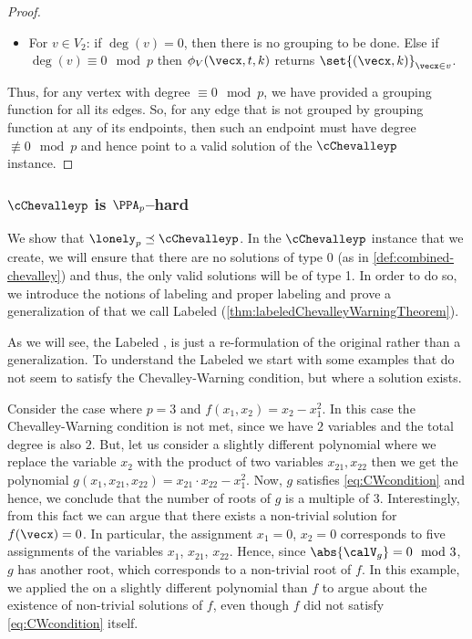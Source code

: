 \begin{proof}
\begin{itemize}[label=$\triangleright$,leftmargin=0.5cm]
\begin{itemize}[leftmargin=0.25cm]
		we define the multiset $\set{(\vecx_j, t(\vecx_j))}_{j \in \bbF_p}$.
		Since $\sum\limits_{j = 0}^{p-1} t(\vecx_j) = 0$, this multiset has
		size multiple of $p$, so we can canonically partition it into groups of size $p$. Then,
		$\phi_V(\vecx, t, k)$ returns the group containing $(\vecx,k)$,
		\item For $v \in V_2$: if $\deg(v) = 0$, then there is no grouping to be done. Else if $\deg(v) \equiv 0 \mod{p}$ then $\phi_V(\vecx,t,k)$ returns
          		$\set{(\vecx,k)}_{\vecx \in v}$.
	  \end{itemize}
\end{itemize}
	Thus, for any vertex with degree $\equiv 0 \mod{p}$, we have provided a grouping function for all its edges. So, for any edge that is not grouped by grouping function at any of its endpoints, then such an endpoint must have degree $\not\equiv 0 \mod{p}$ and hence point to a valid solution of the $\cChevalleyp$ instance.
\end{proof}



\subsubsection{$\cChevalleyp$ is $\PPA_p$--hard}

We show that $\lonely_p \preceq \cChevalleyp$. In the $\cChevalleyp$ instance that we create, we will ensure that there are no solutions of type 0 (as in \autoref{def:combined-chevalley}) and thus, the only valid solutions will be of type 1. In order to do so, we introduce the notions of labeling and proper labeling and prove a generalization of \CWT that we call Labeled \CWT (\autoref{thm:labeledChevalleyWarningTheorem}).

As we will see, the Labeled \CWT, is just a
re-formulation of the original \CWT rather than a generalization. To
understand the Labeled \CWT we start with some
examples that do not seem to satisfy the Chevalley-Warning
condition, but where a solution exists.

\bigskip
{} Consider the case where $p = 3$ and
$f(x_1, x_2) = x_2 - x_1^2$. In this case the Chevalley-Warning condition is not met, since we have $2$ variables and the total degree is also
$2$. But, let us consider a slightly different polynomial where we
replace the variable $x_2$ with the product of two variables
$x_{21}, x_{22}$ then we get the polynomial
$g(x_1, x_{21}, x_{22}) = x_{21} \cdot x_{22} - x_1^2$. Now,
$g$ satisfies \eqref{eq:CWcondition} and hence, we
conclude that the number of roots of $g$ is a multiple of $3$.
Interestingly, from this fact we can argue that there exists a non-trivial solution for $f(\vecx) = 0$.
In particular, the assignment $x_1 = 0$, $x_2 = 0$ corresponds to five
assignments of the variables $x_1$, $x_{21}$, $x_{22}$. Hence, since
$\abs{\calV_{g}} = 0 \mod{3}$, $g$ has another root, which corresponds to a
non-trivial root of $f$. In this example, we applied the
\CWT on a slightly different polynomial than $f$
to argue about the existence of non-trivial solutions of $f$, even though $f$ did not satisfy \eqref{eq:CWcondition} itself.
\bigskip

